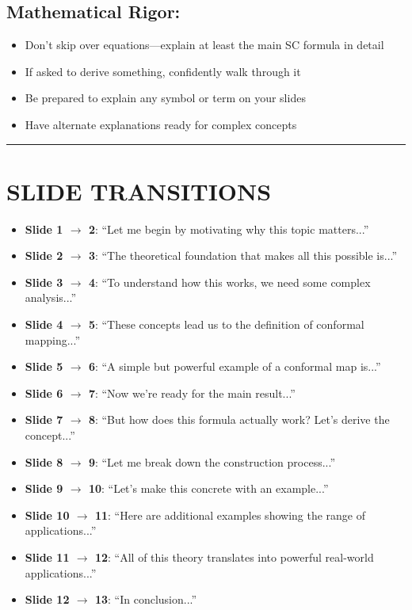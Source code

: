 \documentclass[12pt,a4paper]{article}
\begin{document}
\begin{tipbox}
\subsection*{Mathematical Rigor:}
\begin{itemize}[leftmargin=*]
    \item Don't skip over equations---explain at least the main SC formula in detail
    \item If asked to derive something, confidently walk through it
    \item Be prepared to explain any symbol or term on your slides
    \item Have alternate explanations ready for complex concepts
\end{itemize}
\end{tipbox}

\vspace{10pt}
\hrule
\vspace{10pt}

\section*{SLIDE TRANSITIONS}

\begin{itemize}[leftmargin=*]
    \item \textbf{Slide 1 $\rightarrow$ 2}: ``Let me begin by motivating why this topic matters...''
    \item \textbf{Slide 2 $\rightarrow$ 3}: ``The theoretical foundation that makes all this possible is...''
    \item \textbf{Slide 3 $\rightarrow$ 4}: ``To understand how this works, we need some complex analysis...''
    \item \textbf{Slide 4 $\rightarrow$ 5}: ``These concepts lead us to the definition of conformal mapping...''
    \item \textbf{Slide 5 $\rightarrow$ 6}: ``A simple but powerful example of a conformal map is...''
    \item \textbf{Slide 6 $\rightarrow$ 7}: ``Now we're ready for the main result...''
    \item \textbf{Slide 7 $\rightarrow$ 8}: ``But how does this formula actually work? Let's derive the concept...''
    \item \textbf{Slide 8 $\rightarrow$ 9}: ``Let me break down the construction process...''
    \item \textbf{Slide 9 $\rightarrow$ 10}: ``Let's make this concrete with an example...''
    \item \textbf{Slide 10 $\rightarrow$ 11}: ``Here are additional examples showing the range of applications...''
    \item \textbf{Slide 11 $\rightarrow$ 12}: ``All of this theory translates into powerful real-world applications...''
    \item \textbf{Slide 12 $\rightarrow$ 13}: ``In conclusion...''
\end{itemize}
\end{document}
